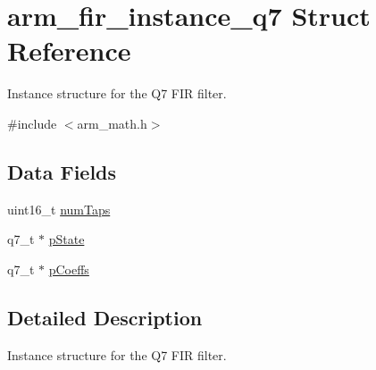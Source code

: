 \hypertarget{structarm__fir__instance__q7}{\section{arm\-\_\-fir\-\_\-instance\-\_\-q7 Struct Reference}
\label{structarm__fir__instance__q7}
}


Instance structure for the Q7 F\-I\-R filter.  




{\ttfamily \#include $<$arm\-\_\-math.\-h$>$}

\subsection*{Data Fields}
\begin{DoxyCompactItemize}
\item 
uint16\-\_\-t \hyperlink{structarm__fir__instance__q7_a751941891e47f522a7f5375fe8990aac}{num\-Taps}
\item 
q7\-\_\-t $\ast$ \hyperlink{structarm__fir__instance__q7_aa8f67102521b620af6f259afdcf29785}{p\-State}
\item 
q7\-\_\-t $\ast$ \hyperlink{structarm__fir__instance__q7_a54407554b4fe7bbbb43924e4eea45e7f}{p\-Coeffs}
\end{DoxyCompactItemize}


\subsection{Detailed Description}
Instance structure for the Q7 F\-I\-R filter. 

